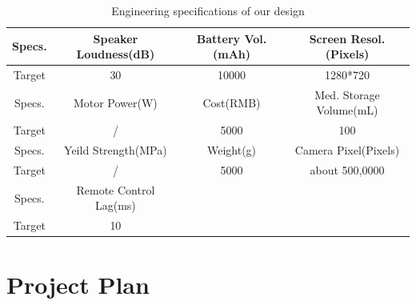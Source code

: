 \documentclass[12pt]{article}
\begin{document}
\begin{table}[H]
	\centering
\begin{tabular}{|c|c|c|c|}
\hline
Specs. & Speaker Loudness(dB)   & Battery Vol.(mAh) & Screen Resol.(Pixels)   \\ \hline
Target   & 30                     & 10000               & 1280*720                    \\ \hline
Specs. & Motor Power(W)         & Cost(RMB)           & Med. Storage Volume(mL) \\ \hline
Target  & /                      & 5000                & 100                         \\ \hline
Specs. & Yeild Strength(MPa)    & Weight(g)           & Camera Pixel(Pixels)        \\ \hline
Target   & /                      & 5000                & about 500,0000              \\ \hline
Specs. & Remote Control Lag(ms) &                     &                             \\ \hline
Target    & 10                     &                     &                             \\ \hline
\end{tabular}
\caption{Engineering specifications of our design }
\label{tab:spec}
\end{table}

\section{Project Plan}
\end{document}
